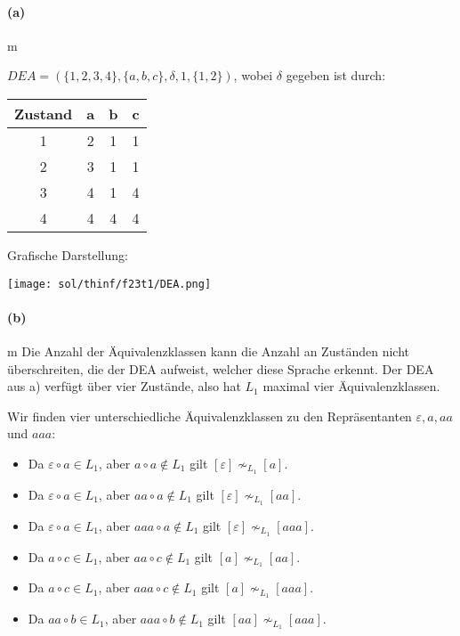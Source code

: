 
\paragraph{(a)}m
		 
	$DEA = (\{ 1,2,3,4\},\{ a,b,c\},\delta,1,\{ 1,2\})$, wobei $\delta$ gegeben ist durch:
		
	\begin{tabular}{c|ccc}
		Zustand & a & b & c \\
		\hline
		1       & 2 & 1 & 1 \\
		2       & 3 & 1 & 1 \\
		3       & 4 & 1 & 4 \\
		4       & 4 & 4 & 4 \\
	\end{tabular} 
		
	Grafische Darstellung:
	\begin{center}
		\texttt{[image: sol/thinf/f23t1/DEA.png]}
	\end{center}	
			
\paragraph{(b)}m
	Die Anzahl der Äquivalenzklassen kann die Anzahl an Zuständen nicht überschreiten, die der DEA aufweist, welcher diese Sprache erkennt. Der DEA aus a) verfügt über vier Zustände, also hat $L_1$ maximal vier Äquivalenzklassen.

	Wir finden vier unterschiedliche Äquivalenzklassen zu den Repräsentanten $\varepsilon, a, aa$ und $aaa$:
	\begin{itemize}
		\item Da $\varepsilon \circ a \in L_1$, aber $a \circ a \notin L_1$ gilt $[\varepsilon]\nsim_{L_1}[a]$.
		\item Da $\varepsilon \circ a \in L_1$, aber $aa \circ a \notin L_1$ gilt $[\varepsilon]\nsim_{L_1}[aa]$.
		\item Da $\varepsilon \circ a \in L_1$, aber $aaa \circ a \notin L_1$ gilt $[\varepsilon]\nsim_{L_1}[aaa]$.
		\item Da $a \circ c \in L_1$, aber $aa \circ c \notin L_1$ gilt $[a]\nsim_{L_1}[aa]$.
		\item Da $a \circ c \in L_1$, aber $aaa \circ c \notin L_1$ gilt $[a]\nsim_{L_1}[aaa]$.
		\item Da $aa \circ b \in L_1$, aber $aaa \circ b \notin L_1$ gilt $[aa]\nsim_{L_1}[aaa]$.
	\end{itemize}
	
